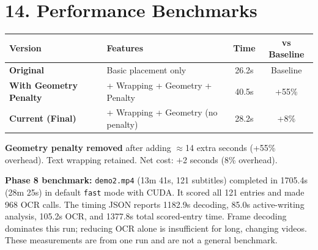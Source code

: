 \documentclass[11pt]{article}
\begin{document}
\section*{14. Performance Benchmarks}

\begin{tabularx}{\textwidth}{>{\bfseries}l X c c}
Version & Features & Time & vs Baseline \\
\midrule
Original & Basic placement only & 26.2s & Baseline \\
With Geometry Penalty & + Wrapping + Geometry + Penalty & 40.5s & +55\% \\
Current (Final) & + Wrapping + Geometry (no penalty) & 28.2s & +8\% \\
\end{tabularx}

\textbf{Geometry penalty removed} after adding $\approx$14 extra seconds (+55\% overhead). Text wrapping retained. Net cost: $+$2 seconds (8\% overhead).

\textbf{Phase 8 benchmark:} \texttt{demo2.mp4} (13m 41s, 121 subtitles) completed in 1705.4s (28m 25s) in default \texttt{fast} mode with CUDA. It scored all 121 entries and made 968 OCR calls. The timing JSON reports 1182.9s decoding, 85.0s active-writing analysis, 105.2s OCR, and 1377.8s total scored-entry time. Frame decoding dominates this run; reducing OCR alone is insufficient for long, changing videos. These measurements are from one run and are not a general benchmark.
\end{document}
